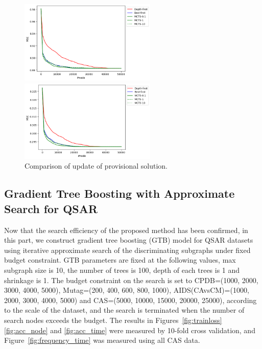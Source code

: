 \begin{figure}[htbp]
 \begin{minipage}{0.5\hsize}
  \begin{center}
   \includegraphics[width=65mm]{img/cas/artificial/1/node_chart.png}
  \end{center}
 \end{minipage}
 \begin{minipage}{0.5\hsize}
  \begin{center}
   \includegraphics[width=65mm]{img/cas/artificial/2/node_chart.png}
  \end{center}
 \end{minipage}
 \caption{Comparison of update of provisional solution.}
  \label{fig:update}
\end{figure}

\subsection{Gradient Tree Boosting with Approximate Search for QSAR}
\label{sec:qsar}
Now that the search efficiency of the proposed method has been confirmed, 
in this part, we construct gradient tree boosting (GTB) \cite{Shirakawa:2018} model for QSAR datasets 
using iterative approximate search of the discriminating subgraphs under fixed budget constraint.
GTB parameters are fixed at the following values,
max subgraph size is 10, the number of trees is 100, depth of each trees is 1 and shrinkage is 1.
The budget constraint on the search is set to 
CPDB=(1000, 2000, 3000, 4000, 5000), Mutag=(200, 400, 600, 800, 1000), 
AIDS(CAvsCM)=(1000, 2000, 3000, 4000, 5000) and CAS=(5000, 10000, 15000, 20000, 25000), 
according to the scale of the dataset, 
and the search is terminated when the number of search nodes exceeds the budget.
The results in Figures~\ref{fig:trainloss} \ref{fig:acc_node} and \ref{fig:acc_time} 
were measured by 10-fold cross validation, 
and Figure~\ref{fig:frequency_time} was measured using all CAS data.

